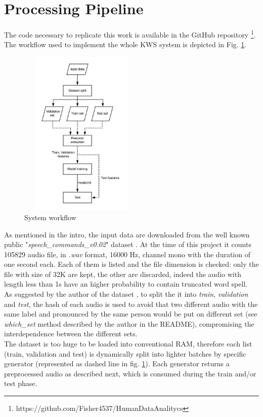 \section{Processing Pipeline}
\label{sec:processing_pipeine}

\noindent The code necessary to replicate this work is available in the GitHub repository \footnote{https://github.com/Fisher4537/HumanDataAnalitycs}.\\
The workflow used to implement the whole KWS system is depicted in Fig. \ref{fig:pipeline}.
\begin{figure}[h]
			\centering
	    	\includegraphics[width=6cm, height=8cm ,width=0.25\textwidth]{pipeline}
	    	\caption{System workflow}
	    	\label{fig:pipeline}
\end{figure} 
\noindent As mentioned in the intro, the input data are downloaded from the well known public "{\it{speech\_commands\_v0.02}}" dataset \cite{Warden-2018}. At the time of this project it counts 105829 audio file, in \textit{.wav} format, 16000 Hz, channel mono with the duration of one second each. Each of them is listed and the file dimension is checked: only the file with size of 32K are kept, the other are discarded, indeed the audio with length less than 1s have an higher probability to contain truncated word spell. \\
As suggested by the author of the dataset \cite{Warden-2018}, to split the it into \textit{train}, \textit{validation} and \textit{test}, the hash of each audio is used to avoid that two different audio with the same label and pronounced by the same person would be put on different set (see \textit{which\_set} method described by the author in the README), compromising the interdependence between the different sets. \\
The dataset is too huge to be loaded into conventional RAM, therefore each list (train, validation and test) is dynamically split into lighter batches by specific generator (represented as dashed line in fig. \ref{fig:pipeline}). Each generator returns a preprocessed audio as described next, which is consumed during the train and/or test phase.\\

